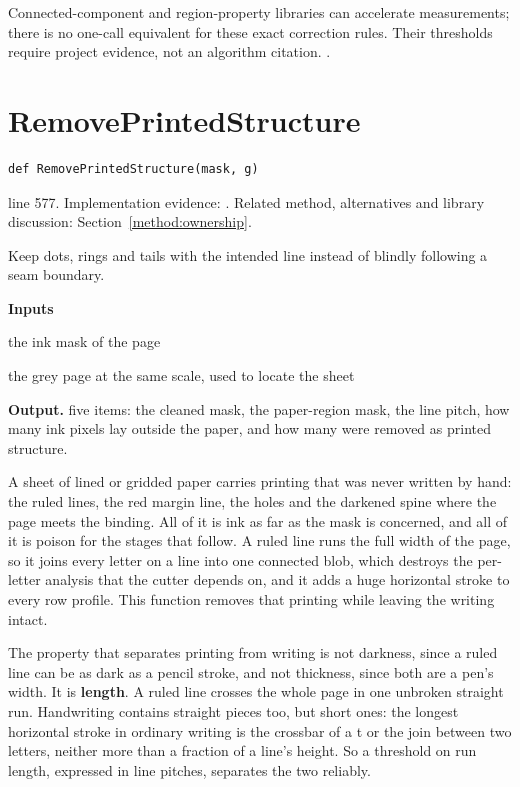 Connected-component and region-property libraries can accelerate measurements; there is no one-call equivalent for these exact correction rules. Their thresholds require project evidence, not an algorithm citation. \cite{code2026,opencvshape}.


\section{RemovePrintedStructure}\label{fn:segment:RemovePrintedStructure}
\begin{lstlisting}[style=sig]
def RemovePrintedStructure(mask, g)
\end{lstlisting}
 line 577. Implementation evidence: \cite{code2026}. Related method, alternatives and library discussion: Section~\ref{method:ownership}.


Keep dots, rings and tails with the intended line instead of blindly following a seam boundary.




\noindent\textbf{Inputs}
\begin{description}[leftmargin=2.2em,style=nextline,font=\normalfont\ttfamily]\setlength\itemsep{1pt}
  \item[{mask}] \normalfont the ink mask of the page
  \item[{g}] \normalfont the grey page at the same scale, used to locate the sheet
\end{description}

\noindent\textbf{Output.} five items: the cleaned mask, the paper-region mask, the line pitch, how many ink pixels lay outside the paper, and how many were removed as printed structure.


A sheet of lined or gridded paper carries printing that was never written by hand: the ruled lines, the red margin line, the holes and the darkened spine where the page meets the binding. All of it is ink as far as the mask is concerned, and all of it is poison for the stages that follow. A ruled line runs the full width of the page, so it joins every letter on a line into one connected blob, which destroys the per-letter analysis that the cutter depends on, and it adds a huge horizontal stroke to every row profile. This function removes that printing while leaving the writing intact.


The property that separates printing from writing is not darkness, since a ruled line can be as dark as a pencil stroke, and not thickness, since both are a pen's width. It is \textbf{length}. A ruled line crosses the whole page in one unbroken straight run. Handwriting contains straight pieces too, but short ones: the longest horizontal stroke in ordinary writing is the crossbar of a t or the join between two letters, neither more than a fraction of a line's height. So a threshold on run length, expressed in line pitches, separates the two reliably.


